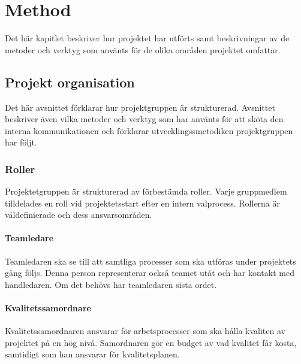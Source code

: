
\chapter{Method}
\label{cha:method}
Det här kapitlet beskriver hur projektet har utförts samt beskrivningar av de metoder och verktyg som använts för de olika områden projektet omfattar.

\section{Projekt organisation}
Det här avsnittet förklarar hur projektgruppen är strukturerad. Avsnittet beskriver även vilka metoder och verktyg som har använts för att sköta den interna kommunikationen och förklarar utvecklingssmetodiken projektgruppen har följt.

\subsection*{Roller}
Projektetgruppen är strukturerad av förbestämda roller. Varje gruppmedlem tilldelades en roll vid projektetsstart efter en intern valprocess. Rollerna är väldefinierade och dess ansvarsområden.

\subsubsection*{Teamledare}
Teamledaren ska se till att samtliga processer som ska utföras under projektets gång följs. Denna person representerar också teamet utåt och har kontakt med handledaren. Om det behövs har teamledaren sista ordet.

\subsubsection*{Kvalitetssamordnare}
Kvalitetssamordnaren ansvarar för arbetsprocesser som ska hålla kvaliten av projektet på en hög nivå. Samordnaren gör en budget av vad kvalitet får kosta, samtidigt som han ansvarar för kvalitetsplanen.

